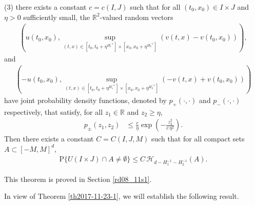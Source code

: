 \documentclass[12pt,a4paper]{article}
\newcommand{\R}{{\mathbb{R}}}
\renewcommand{\P}{\mathrm{P}}
\newcommand {\deltah}{{\zeta}}
\newcommand{\<}{\langle}
\renewcommand{\>}{\rangle}
\begin{document}
\begin{theorem}
   (3) there exists a constant $c = c(I, J)$ such that for all $(t_0, x_0) \in I \times J$ and $\eta> 0$ sufficiently small, the $\R^2$-valued random vectors
\begin{align*}
\left(u(t_0, x_0), \sup_{(t, x) \in [t_0, t_0 + \eta^{H_1^{-1}}] \times [x_0, x_0 + \eta^{H_2^{-1}}]}(v(t, x) - v(t_0, x_0))\right),
\end{align*}
and \begin{align*} 
\left(-u(t_0, x_0), \sup_{(t, x) \in [t_0, t_0 + \eta^{H_1^{-1}}] \times [x_0, x_0 + \eta^{H_2^{-1}}]}(-v(t, x) + v(t_0, x_0))\right)
\end{align*}
have joint probability density functions, denoted by $p_{+}(\cdot, \cdot)$ and $p_{-}(\cdot, \cdot)$ respectively, that satisfy,   for all $z_1 \in \mathbb{R}$ and $z_2 \geq \eta$, %
\begin{align} \label{eq2017-11-23-5}
p_{\pm}(z_1, z_2) &\leq \frac{c}{\eta} %
   \exp\left(-\frac{z_2^2}{c\,  \eta^2} \right).%
\end{align}
Then there exists a constant $C = C(I, J, M)$ such that for all compact sets $A \subset [-M, M]^d$,
\begin{align} \label{eq2017-11-23-11}
\P\{U(I \times J) \cap A \neq \emptyset\} \leq C \, \mathscr{H}_{d - H_1^{-1} - H_2^{-1}}(A).
\end{align}
\end{theorem}

This theorem is proved in Section \ref{rd08_11s1}.
\bigskip

\medskip

In view of Theorem \ref{th2017-11-23-1}, we will establish the following result.
\end{document}
